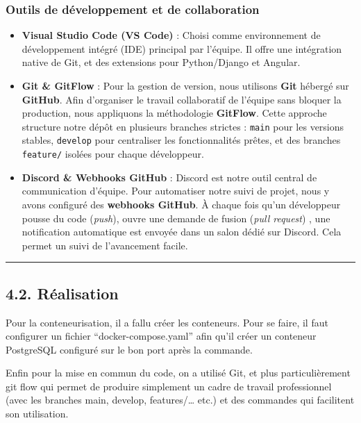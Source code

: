 \hypertarget{outils-de-duxe9veloppement-et-de-collaboration}{%
\subsubsection{Outils de développement et de
collaboration}\label{outils-de-duxe9veloppement-et-de-collaboration}}

\begin{itemize}
\tightlist
\item
  \textbf{Visual Studio Code (VS Code)} : Choisi comme environnement de
  développement intégré (IDE) principal par l'équipe. Il offre une
  intégration native de Git, et des extensions pour Python/Django et
  Angular.
\item
  \textbf{Git \& GitFlow} : Pour la gestion de version, nous utilisons
  \textbf{Git} hébergé sur \textbf{GitHub}. Afin d'organiser le travail
  collaboratif de l'équipe sans bloquer la production, nous appliquons
  la méthodologie \textbf{GitFlow}. Cette approche structure notre dépôt
  en plusieurs branches strictes : \texttt{main} pour les versions
  stables, \texttt{develop} pour centraliser les fonctionnalités prêtes,
  et des branches \texttt{feature/} isolées pour chaque développeur.
\item
  \textbf{Discord \& Webhooks GitHub} : Discord est notre outil central
  de communication d'équipe. Pour automatiser notre suivi de projet,
  nous y avons configuré des \textbf{webhooks GitHub}. À chaque fois
  qu'un développeur pousse du code (\emph{push}), ouvre une demande de
  fusion (\emph{pull request}) , une notification automatique est
  envoyée dans un salon dédié sur Discord. Cela permet un suivi de
  l'avancement facile.
\end{itemize}

\begin{center}\rule{0.5\linewidth}{0.5pt}\end{center}

\newpage

\hypertarget{ruxe9alisation}{%
\subsection{4.2. Réalisation}\label{ruxe9alisation}}

Pour la conteneurisation, il a fallu créer les conteneurs. Pour se
faire, il faut configurer un fichier ``docker-compose.yaml'' afin qu'il
créer un conteneur PostgreSQL configuré sur le bon port après la
commande.

Enfin pour la mise en commun du code, on a utilisé Git, et plus
particulièrement git flow qui permet de produire simplement un cadre de
travail professionnel (avec les branches main, develop,
features/\ldots{} etc.) et des commandes qui facilitent son utilisation.

